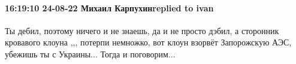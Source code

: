 
 
 
 
 

\paragraph{16:19:10 24-08-22 Михаил Карпухинreplied to ivan}

Ты дебил, поэтому ничего и не знаешь, да и не просто дэбил, а сторонник
кровавого клоуна ,,, потерпи немножко, вот клоун взорвёт Запорожскую АЭС,
убежишь ты с Украины... Тогда и поговорим...
